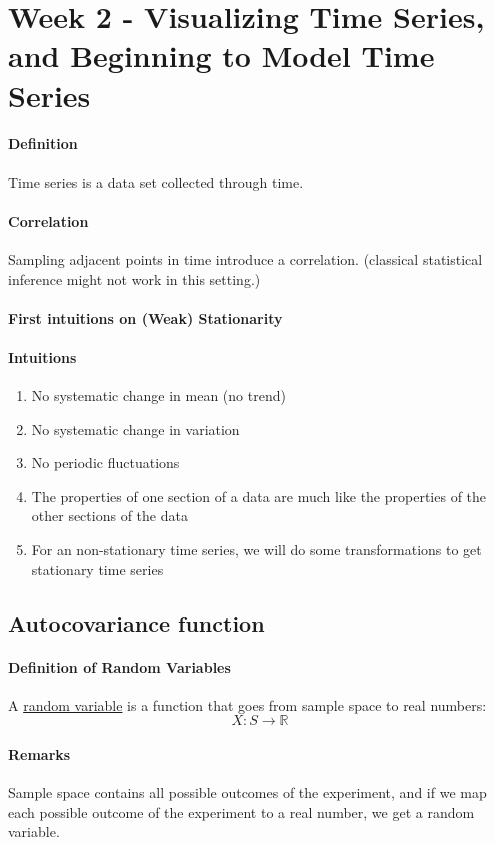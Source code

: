 \documentclass[11pt]{article}
\newcommand{\real}[0]{\mathbb{R}}
\newcommand{\under}[1]{\underline{#1}}
\begin{document}
\section{Week 2 - Visualizing Time Series, and Beginning to Model Time Series}
\paragraph{Definition}
Time series is a data set collected through time.
\paragraph{Correlation}
Sampling adjacent points in time introduce a correlation.
(classical statistical inference might not work in this setting.)
\paragraph{First intuitions on (Weak) Stationarity}
\paragraph{Intuitions}
\begin{enumerate}
	\item No systematic change in mean (no trend)
	\item No systematic change in variation
	\item No periodic fluctuations
	\item The properties of one section of a data are much like the properties of the other sections of the data
	\item For an non-stationary time series, we will do some transformations to get stationary time series
\end{enumerate}

\subsection{Autocovariance function}
\paragraph{Definition of Random Variables}
A \under{random variable} is a function that goes from sample space to real numbers:
$$X: S \rightarrow \real$$
\paragraph{Remarks}
Sample space contains all possible outcomes of the experiment, and if we map each possible outcome of the experiment to a real number, we get a random variable.
\end{document}

